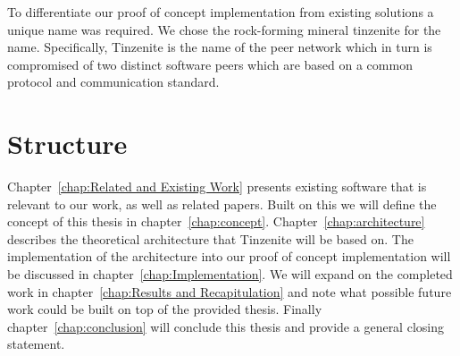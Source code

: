 To differentiate our proof of concept implementation from existing solutions a unique name was required.
We chose the rock-forming mineral tinzenite for the name.
Specifically, Tinzenite is the name of the peer network which in turn is compromised of two distinct software peers which are based on a common protocol and communication standard.

\section{Structure}
\label{sec:Structure}

Chapter~\ref{chap:Related and Existing Work} presents existing software that is relevant to our work, as well as related papers.
Built on this we will define the concept of this thesis in chapter~\ref{chap:concept}.
Chapter~\ref{chap:architecture} describes the theoretical architecture that Tinzenite will be based on.
The implementation of the architecture into our proof of concept implementation will be discussed in chapter~\ref{chap:Implementation}.
We will expand on the completed work in chapter~\ref{chap:Results and Recapitulation} and note what possible future work could be built on top of the provided thesis.
Finally chapter~\ref{chap:conclusion} will conclude this thesis and provide a general closing statement.
